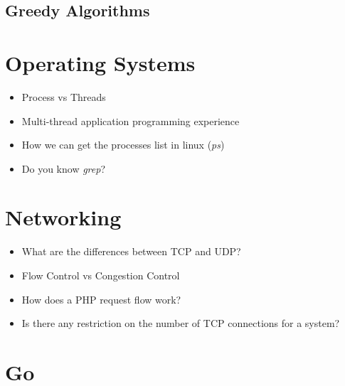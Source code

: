 \documentclass[]{book}
\begin{document}
\subsection{Greedy Algorithms}

\section{Operating Systems}
\begin{itemize}
  \item Process vs Threads
  \item Multi-thread application programming experience
  \item How we can get the processes list in linux (\textit{ps})
  \item Do you know \textit{grep}?
\end{itemize}

\section{Networking}
\begin{itemize}
  \item What are the differences between TCP and UDP\@?
  \item Flow Control vs Congestion Control
  \item How does a PHP request flow work?
  \item Is there any restriction on the number of TCP connections for a system?
\end{itemize}

\section{Go}
\end{document}
